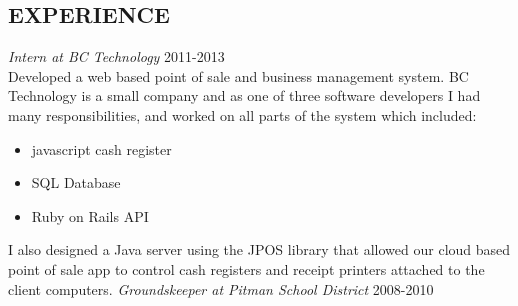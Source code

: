 \documentclass[line, margin]{res}
\begin{document}
\begin{resume}
    \section{EXPERIENCE}
    \textit{Intern at BC Technology} \hfill 2011-2013 \\
    Developed a web based point of sale and business management system.
    BC Technology is a small company and as one of three software developers
    I had many responsibilities, and worked on all parts of the system which included:
    \begin{itemize}
      \item javascript cash register
      \item SQL Database
      \item Ruby on Rails API
    \end{itemize}
    I also designed a Java server using the JPOS library that allowed our cloud based point of sale app
    to control cash registers and receipt printers attached to the client computers.
    \textit{Groundskeeper at Pitman School District} \hfill 2008-2010 \\
  \end{resume}
\end{document}
